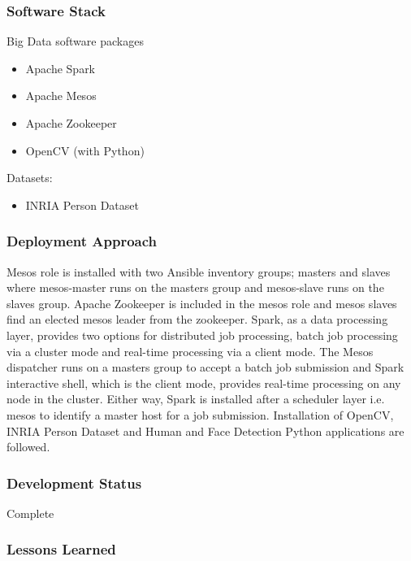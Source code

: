 \documentclass[9pt,twocolumn,twoside]{styles/osajnl}
\begin{document}
\subsubsection{Software Stack}

Big Data software packages

\begin{itemize}
\item Apache Spark
\item Apache Mesos
\item Apache Zookeeper
\item OpenCV (with Python)
\end{itemize}

Datasets:

\begin{itemize}
\item INRIA Person Dataset
\end{itemize}

\subsubsection{Deployment Approach}

Mesos role is installed with two Ansible inventory groups; masters and
slaves where mesos-master runs on the masters group and mesos-slave
runs on the slaves group. Apache Zookeeper is included in the mesos
role and mesos slaves find an elected mesos leader from the
zookeeper. Spark, as a data processing layer, provides two options for
distributed job processing, batch job processing via a cluster mode
and real-time processing via a client mode. The Mesos dispatcher runs
on a masters group to accept a batch job submission and Spark
interactive shell, which is the client mode, provides real-time
processing on any node in the cluster. Either way, Spark is installed
after a scheduler layer i.e. mesos to identify a master host for a job
submission. Installation of OpenCV, INRIA Person Dataset and Human and
Face Detection Python applications are followed.

\subsubsection{Development Status}

Complete

\subsubsection{Lessons Learned}
\end{document}
